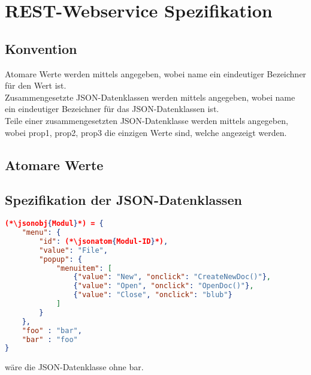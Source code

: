 \section{REST-Webservice Spezifikation}
\subsection{Konvention}
Atomare Werte werden mittels  angegeben, wobei name ein eindeutiger Bezeichner für den Wert ist.\\
Zusammengesetzte JSON-Datenklassen werden mittels  angegeben, wobei name ein eindeutiger Bezeichner für das JSON-Datenklassen ist.\\
Teile einer zusammengesetzten JSON-Datenklasse werden mittels  angegeben, wobei prop1, prop2, prop3 die einzigen Werte sind, welche angezeigt werden.




\FloatBarrier
\subsection{Atomare Werte}

\FloatBarrier
\subsection{Spezifikation der JSON-Datenklassen}
\begin{lstlisting}[language=json,firstnumber=-3]
(*\jsonobj{Modul}*) = {
	"menu": {
		"id": (*\jsonatom{Modul-ID}*),
		"value": "File",
		"popup": {
			"menuitem": [
				{"value": "New", "onclick": "CreateNewDoc()"},
				{"value": "Open", "onclick": "OpenDoc()"},
				{"value": "Close", "onclick": "blub"}
			]
		}
	},
	"foo" : "bar",
	"bar" : "foo"
}
\end{lstlisting}
 wäre die JSON-Datenklasse  ohne bar.

\FloatBarrier
